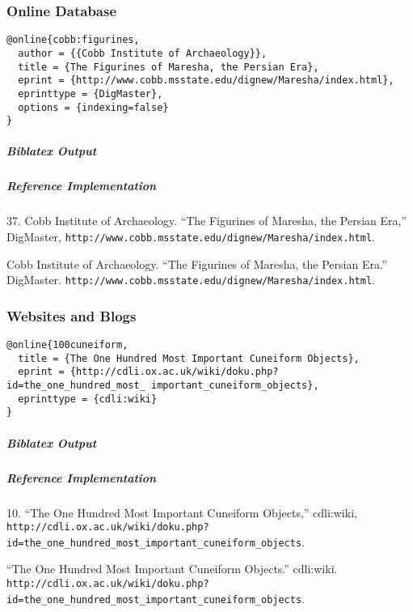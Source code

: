 \documentclass[a4paper]{article}
\newenvironment{biboutput}{%
  \subparagraph{Biblatex Output}
}{\color{black}}
\newenvironment{refimp}{%
  \subparagraph{Reference Implementation}
  \color{reference-colour}
  \rm
}{\par\color{black}}
\begin{document}
\subsubsection{Online Database}

\begin{lstlisting}
@online{cobb:figurines,
  author = {{Cobb Institute of Archaeology}},
  title = {The Figurines of Maresha, the Persian Era},
  eprint = {http://www.cobb.msstate.edu/dignew/Maresha/index.html},
  eprinttype = {DigMaster},
  options = {indexing=false}
}
\end{lstlisting}

\begin{biboutput}
\end{biboutput}

\begin{refimp}
  \hspace*{\bibindent}37. Cobb Institute of Archaeology. “The Figurines of
  Maresha, the Persian Era,” DigMaster,
  \nolinkurl{http://www.cobb.msstate.edu/dignew/Maresha/index.html}.

  \hangindent\bibindent Cobb Institute of Archaeology. “The Figurines of
  Maresha, the Persian Era.” DigMaster.
  \nolinkurl{http://www.cobb.msstate.edu/dignew/Maresha/index.html}.
\end{refimp}

\subsubsection{Websites and Blogs}

\begin{lstlisting}
@online{100cuneiform,
  title = {The One Hundred Most Important Cuneiform Objects},
  eprint = {http://cdli.ox.ac.uk/wiki/doku.php?id=the_one_hundred_most_ important_cuneiform_objects},
  eprinttype = {cdli:wiki}
}
\end{lstlisting}

\begin{biboutput}
\end{biboutput}

\begin{refimp}
  \hspace*{\bibindent}10. “The One Hundred Most Important Cuneiform Objects,”
  cdli:wiki,
  \nolinkurl{http://cdli.ox.ac.uk/wiki/doku.php?id=the_one_hundred_most_important_cuneiform_objects}.

  \hangindent\bibindent “The One Hundred Most Important Cuneiform Objects.”
  cdli:wiki.
  \nolinkurl{http://cdli.ox.ac.uk/wiki/doku.php?id=the_one_hundred_most_important_cuneiform_objects}.
\end{refimp}
\end{document}
